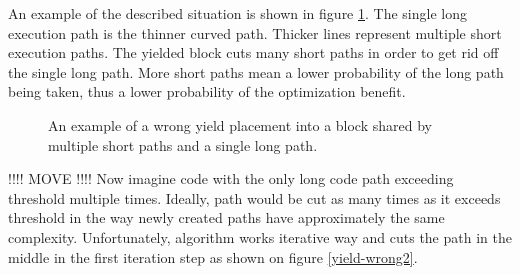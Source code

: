An example of the described situation is shown in figure \ref{yield-wrong1}. The single long execution path is the thinner curved path. Thicker lines represent multiple short execution paths. The yielded block cuts many short paths in order to get rid off the single long path. More short paths mean a lower probability of the long path being taken, thus a lower probability of the optimization benefit.

\begin{figure}[h!]
\caption{An example of a wrong yield placement into a block shared by multiple short paths and a single long path.}
\label{yield-wrong1}
\centering
\vspace{0.5cm}
\end{figure}

!!!! MOVE !!!!
Now imagine code with the only long code path exceeding threshold multiple times. Ideally, path would be cut as many times as it exceeds threshold in the way newly created paths have approximately the same complexity. Unfortunately, algorithm works iterative way and cuts the path in the middle in the first iteration step as shown on figure \ref{yield-wrong2}.

